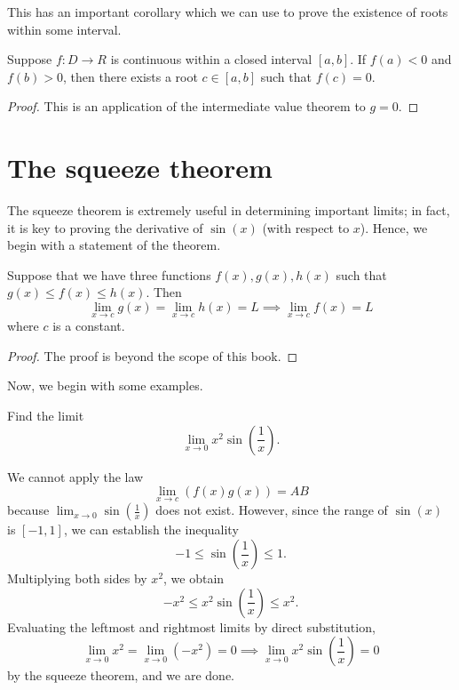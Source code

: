 This has an important corollary which we can use to prove the existence of roots within some interval.
\begin{corollary}
    Suppose $f : D \to R$ is continuous within a closed interval $[a, b]$. If
    $f(a) < 0$ and $f(b) > 0$, then there exists a root $c \in [a, b]$ such that
    $f(c) = 0$.
\end{corollary}
\begin{proof}
    This is an application of the intermediate value theorem to $g = 0$.
\end{proof}

\section{The squeeze theorem}
The squeeze theorem is extremely useful in determining important limits; in fact, it is key to proving the
derivative of $\sin(x)$ (with respect to $x$). Hence, we begin with a statement of the theorem.

\begin{theorem}
    Suppose that we have three functions $f(x), g(x), h(x)$ such that $g(x)\le f(x)\le h(x)$. Then
    \[
    \lim_{x \to c} g(x) = \lim_{x \to c} h(x) = L \implies \lim_{x \to c} f(x) = L
    \]
    where $c$ is a constant.
\end{theorem}
\begin{proof}
    The proof is beyond the scope of this book.
\end{proof}

Now, we begin with some examples.

\begin{example}
    Find the limit \[\lim_{x \to 0}x^2\sin\left(\frac{1}{x}\right).\]
\end{example}
\begin{solution}
    We cannot apply the law
    \[
    \lim_{x \to c} (f(x) g(x)) = A B
    \]
    because $\lim_{x \to 0} \sin\left(\frac{1}{x}\right)$ does not exist. However, since the range of $\sin(x)$
    is $[-1, 1]$, we can establish the inequality \[-1 \le \sin\left(\frac{1}{x}\right) \le 1.\] Multiplying both
    sides by $x^2$, we obtain \[-x^2 \le x^2 \sin\left(\frac{1}{x}\right) \le x^2.\]
    Evaluating the leftmost and
    rightmost limits by direct substitution,
    \[\lim_{x \to 0} x^2 = \lim_{x \to 0} (-x^2) = 0 \implies
    \lim_{x \to 0} x^2 \sin\left(\frac{1}{x}\right) = 0 \]
    by the squeeze theorem, and we are done.
\end{solution}

